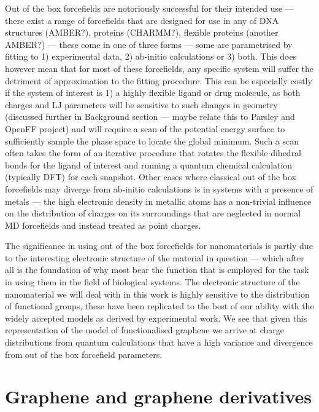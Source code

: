 Out of the box forcefields are notoriously successful for their intended use — there exist a range of forcefields that are designed for use in any of DNA structures (AMBER?), proteins (CHARMM?), flexible proteins (another AMBER?) — these come in one of three forms — some are parametrised by fitting to 1) experimental data, 2) ab-initio calculations or 3) both. This does however mean that for most of these forcefields, any specific system will suffer the detriment of approximation to the fitting procedure. This can be especially costly if the system of interest is 1) a highly flexible ligand or drug molecule, as both charges and LJ parameters will be sensitive to such changes in geometry (discussed further in Background section — maybe relate this to Parsley and OpenFF project) and will require a scan of the potential energy surface to sufficiently sample the phase space to locate the global minimum. Such a scan often takes the form of an iterative procedure that rotates the flexible dihedral bonds for the ligand of interest and running a quantum chemical calculation (typically DFT) for each snapshot. Other cases where classical out of the box forcefields may diverge from ab-initio calculations is in systems with a presence of metals — the high electronic density in metallic atoms has a non-trivial influence on the distribution of charges on its surroundings that are neglected in normal MD forcefields and instead treated as point charges. 

The significance in using out of the box forcefields for nanomaterials is partly due to the interesting electronic structure of the material in question — which after all is the foundation of why most bear the function that is employed for the task in using them in the field of biological systems. The electronic structure of the nanomaterial we will deal with in this work is highly sensitive to the distribution of functional groups, these have been replicated to the best of our ability with the widely accepted models as derived by experimental work. We see that given this representation of the model of functionalised graphene we arrive at charge distributions from quantum calculations that have a high variance and divergence from out of the box forcefield parameters. 

\section{Graphene and graphene derivatives}

